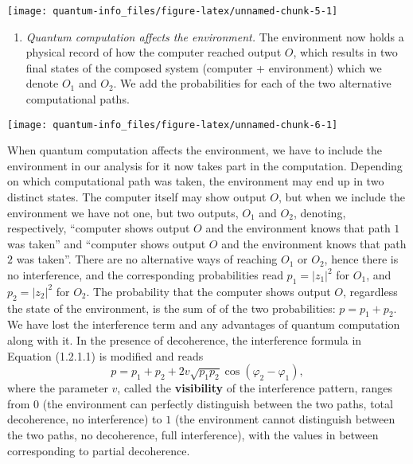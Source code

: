 \documentclass[fleqn]{article}
\providecommand{\tightlist}{%
  \setlength{\itemsep}{0pt}\setlength{\parskip}{0pt}}
\begin{document}
\begin{center}\texttt{[image: quantum-info\_files/figure-latex/unnamed-chunk-5-1]} \end{center}

\begin{enumerate}
\def\labelenumi{\arabic{enumi}.}
\setcounter{enumi}{1}
\tightlist
\item
  \emph{Quantum computation affects the environment.}
  The environment now holds a physical record of how the computer reached output \(O\), which results in two final states of the composed system (computer + environment) which we denote \(O_1\) and \(O_2\).
  We add the probabilities for each of the two alternative computational paths.
\end{enumerate}

\begin{center}\texttt{[image: quantum-info\_files/figure-latex/unnamed-chunk-6-1]} \end{center}

When quantum computation affects the environment, we have to include the environment in our analysis for it now takes part in the computation.
Depending on which computational path was taken, the environment may end up in two distinct states.
The computer itself may show output \(O\), but when we include the environment we have not one, but two outputs, \(O_1\) and \(O_2\), denoting, respectively, ``computer shows output \(O\) and the environment knows that path \(1\) was taken'' and ``computer shows output \(O\) and the environment knows that path \(2\) was taken''.
There are no alternative ways of reaching \(O_1\) or \(O_2\), hence there is no interference, and the corresponding probabilities read \(p_1=|z_1|^2\) for \(O_1\), and \(p_2=|z_2|^2\) for \(O_2\).
The probability that the computer shows output \(O\), regardless the state of the environment, is the sum of of the two probabilities: \(p=p_1+p_2\).
We have lost the interference term and any advantages of quantum computation along with it.
In the presence of decoherence, the interference formula in Equation (1.2.1.1) is modified and reads
\[
p
= p_1 + p_2 + 2 v \sqrt{p_1 p_2}\cos (\varphi_2-\varphi_1),
\]
where the parameter \(v\), called the \textbf{visibility} of the interference pattern, ranges from \(0\) (the environment can perfectly distinguish between the two paths, total decoherence, no interference) to \(1\) (the environment cannot distinguish between the two paths, no decoherence, full interference), with the values in between corresponding to partial decoherence.
\end{document}

